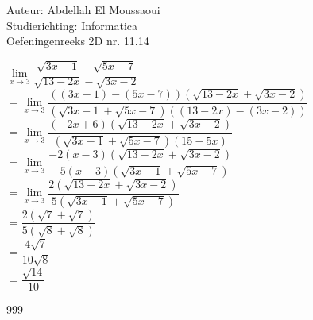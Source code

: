 \documentclass[a4paper]{article}
\begin{document}
  
\noindent \large Auteur: Abdellah El Moussaoui \\
\noindent \large Studierichting: Informatica\\
\noindent \large Oefeningenreeks 2D nr. 11.14\\

\medskip

\normalsize


$\lim\limits_{x\to3} \dfrac{\sqrt{3x-1}-\sqrt{5x-7}}{\sqrt{13-2x}-\sqrt{3x-2}}$\\


$= \lim\limits_{x\to3} \dfrac{\left(\left(3x-1\right) - \left(5x-7\right)\right)\left(\sqrt{13-2x} + \sqrt{3x-2}\right)}{\left(\sqrt{3x-1}+\sqrt{5x-7}\right)\left(\left(13-2x\right) - \left(3x-2\right)\right)}$ \\

$= \lim\limits_{x\to3} \dfrac{\left(-2x+6\right)\left(\sqrt{13-2x}+\sqrt{3x-2}\right)}{\left(\sqrt{3x-1}+\sqrt{5x-7}\right)\left(15-5x\right)}$\\


$= \lim\limits_{x\to3} \dfrac{-2\left(x-3\right)\left(\sqrt{13-2x}+\sqrt{3x-2}\right)}{-5\left(x-3\right)\left(\sqrt{3x-1}+\sqrt{5x-7}\right)}$\\

$= \lim\limits_{x\to3} \dfrac{2\left(\sqrt{13-2x}+\sqrt{3x-2}\right)}{5\left(\sqrt{3x-1}+\sqrt{5x-7}\right)}$\\


$= \dfrac{2\left(\sqrt{7} + \sqrt{7}\right)}{5\left(\sqrt{8}+\sqrt{8}\right)}$\\

$= \dfrac{4\sqrt{7}}{10\sqrt{8}}$\\

$= \dfrac{\sqrt{14}}{10}$\\


\begin{thebibliography}{999}
\end{thebibliography}
\end{document}
